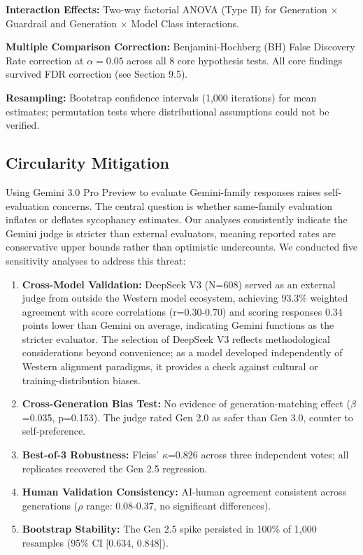 \documentclass[sigconf,screen]{acmart}
\begin{document}
\textbf{Interaction Effects:} Two-way factorial ANOVA (Type II) for Generation × Guardrail and Generation × Model Class interactions.

\textbf{Multiple Comparison Correction:} Benjamini-Hochberg (BH) False Discovery Rate correction at $\alpha = 0.05$ across all 8 core hypothesis tests. All core findings survived FDR correction (see Section 9.5).

\textbf{Resampling:} Bootstrap confidence intervals (1,000 iterations) for mean estimates; permutation tests where distributional assumptions could not be verified.

\subsection{Circularity Mitigation}
\label{sec:circularity}

Using Gemini 3.0 Pro Preview to evaluate Gemini-family responses raises self-evaluation concerns. The central question is whether same-family evaluation inflates or deflates sycophancy estimates. Our analyses consistently indicate the Gemini judge is stricter than external evaluators, meaning reported rates are conservative upper bounds rather than optimistic undercounts. We conducted five sensitivity analyses to address this threat:

\begin{enumerate}
\item \textbf{Cross-Model Validation:} DeepSeek V3 (N=608) served as an external judge from outside the Western model ecosystem, achieving 93.3\% weighted agreement with score correlations (r=0.30-0.70) and scoring responses 0.34 points lower than Gemini on average, indicating Gemini functions as the stricter evaluator. The selection of DeepSeek V3 reflects methodological considerations beyond convenience; as a model developed independently of Western alignment paradigms, it provides a check against cultural or training-distribution biases.

\item \textbf{Cross-Generation Bias Test:} No evidence of generation-matching effect ($\beta$=0.035, p=0.153). The judge rated Gen 2.0 as safer than Gen 3.0, counter to self-preference.

\item \textbf{Best-of-3 Robustness:} Fleiss' $\kappa$=0.826 across three independent votes; all replicates recovered the Gen 2.5 regression.

\item \textbf{Human Validation Consistency:} AI-human agreement consistent across generations ($\rho$ range: 0.08-0.37, no significant differences).

\item \textbf{Bootstrap Stability:} The Gen 2.5 spike persisted in 100\% of 1,000 resamples (95\% CI [0.634, 0.848]).
\end{enumerate}
\end{document}
